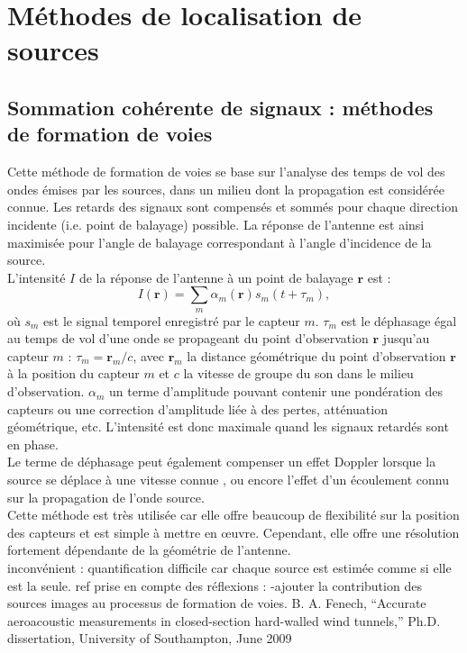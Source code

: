 \section{Méthodes de localisation de sources}


\subsection{Sommation cohérente de signaux : méthodes de formation de voies}
Cette méthode de formation de voies se base sur l'analyse des temps de vol des ondes émises par les sources, dans un milieu dont la propagation est considérée connue. Les retards des signaux sont compensés et sommés pour chaque direction incidente (i.e. point de balayage) possible. La réponse de l'antenne est ainsi maximisée pour l'angle de balayage correspondant à l'angle d'incidence de la source.\\
L'intensité $I$ de la réponse de l'antenne à un point de balayage $\bm{r}$ est : 
\begin{equation}
I(\bm{r})=\sum_{m} \alpha_m(\bm{r}) s_m(t+\tau_m),
\end{equation}
où $s_m$ est le signal temporel enregistré par le capteur $m$. $\tau_m$ est le déphasage égal au temps de vol d'une onde se propageant du point d'observation $\bm{r}$ jusqu'au capteur $m$ : $\tau_m=\bm{r}_m / c$, avec $\bm{r}_m$ la distance géométrique du point d'observation $\bm{r}$ à la position du capteur $m$ et $c$ la vitesse de groupe du son dans le milieu d'observation. $\alpha_m$ un terme d'amplitude pouvant contenir une pondération des capteurs ou une correction d'amplitude liée à des pertes, atténuation géométrique, etc. L'intensité est donc maximale quand les signaux retardés sont en phase.\\
Le terme de déphasage peut également compenser un effet Doppler lorsque la source se déplace à une vitesse connue \citep{howell_1986}, ou encore l'effet d'un écoulement connu sur la propagation de l'onde source.\\

Cette méthode est très utilisée  car elle offre beaucoup de flexibilité sur la position des capteurs et est simple à mettre en œuvre. Cependant, elle offre une résolution fortement dépendante de la géométrie de l'antenne.\\

inconvénient : quantification difficile car chaque source est estimée comme si elle est la seule. 
ref prise en compte des réflexions :
-ajouter la contribution des sources images au processus de formation de voies. B. A. Fenech, “Accurate aeroacoustic measurements in closed-section hard-walled wind tunnels,” Ph.D. dissertation, University of Southampton, June 2009
 
